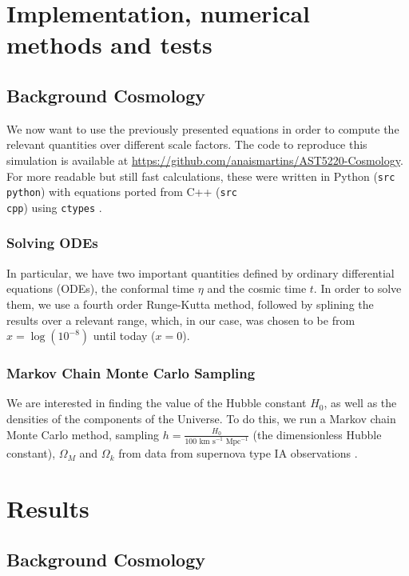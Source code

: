 \documentclass{aa}
\begin{document}
\section{Implementation, numerical methods and tests}

\subsection{Background Cosmology}

We now want to use the previously presented equations in order to compute the relevant quantities over different scale factors. The code to reproduce this simulation is available at \url{https://github.com/anaismartins/AST5220-Cosmology}. For more readable but still fast calculations, these were written in Python (\texttt{src\\python}) with equations ported from C++ (\texttt{src\\cpp}) using \texttt{ctypes} \cite{ctypes}.

\subsubsection{Solving ODEs}

In particular, we have two important quantities defined by ordinary differential equations (ODEs), the conformal time $\eta$ and the cosmic time $t$. In order to solve them, we use a fourth order Runge-Kutta method, followed by splining the results over a relevant range, which, in our case, was chosen to be from $x=\log(10^{-8})$ until today ($x=0$).

\subsubsection{Markov Chain Monte Carlo Sampling}

We are interested in finding the value of the Hubble constant $H_0$, as well as the densities of the components of the Universe. To do this, we run a Markov chain Monte Carlo method, sampling $h = \frac{H_0}{100\text{ km s}^{-1}\text{ Mpc}^{-1}}$ (the dimensionless Hubble constant), $\Omega_M$ and $\Omega_k$ from data from supernova type IA observations \citep{Betoule_2014}.

\section{Results}

\subsection{Background Cosmology}
\end{document}
